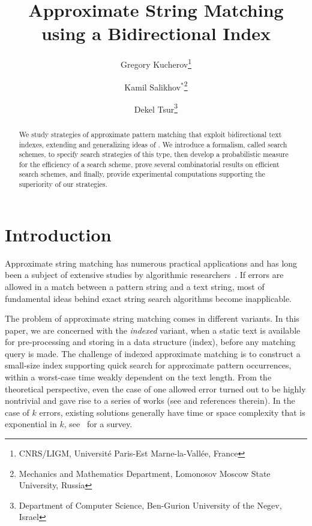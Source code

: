 \documentclass[12pt]{article}
\begin{document}
\title{Approximate String Matching using a Bidirectional Index}
\author{
Gregory Kucherov\thanks{CNRS/LIGM, Universit\'e Paris-Est Marne-la-Vall\'ee, France}
\and
Kamil Salikhov$^*$\thanks{Mechanics and Mathematics Department, Lomonosov Moscow State University, Russia}
\and
Dekel Tsur\thanks{Department of Computer Science, Ben-Gurion University of
the Negev, Israel}
}
\date{}
\maketitle

\begin{abstract}
We study strategies of approximate pattern matching that exploit
bidirectional text indexes, extending and generalizing ideas of
\cite{LamLTWWY09}. We introduce a formalism, called search schemes, to specify search strategies of
this type, then develop a probabilistic measure for the efficiency of
a search scheme, prove several combinatorial results on efficient
search schemes, and finally, provide experimental computations
supporting the superiority of our strategies. 
\end{abstract}

\section{Introduction}

Approximate
string matching has numerous practical applications and has long been a subject of extensive studies by 
algorithmic researchers~\cite{Navarro:2001:GTA:375360.375365}. If errors are allowed in a
match between a pattern string and a text string, most of
fundamental ideas behind exact string search algorithms become
inapplicable.

The problem of approximate string matching comes in
different variants. In this paper, we are concerned with the
\emph{indexed} variant, when a static text is available for
pre-processing and storing in a data structure (index), before any matching
query is made. 
The 
challenge of indexed approximate matching is to construct a small-size
index supporting quick search for approximate 
pattern occurrences, within a worst-case time weakly dependent on the text
length. 
From the theoretical perspective, 
even the case of one allowed error turned out to be
highly nontrivial and gave rise to a series of works (see
\cite{LamSW05} and references therein). In the case of $k$ errors,
existing solutions generally have time or space complexity that is exponential
in $k$, see~\cite{SungEncyclopedia08} for a survey.
\end{document}
